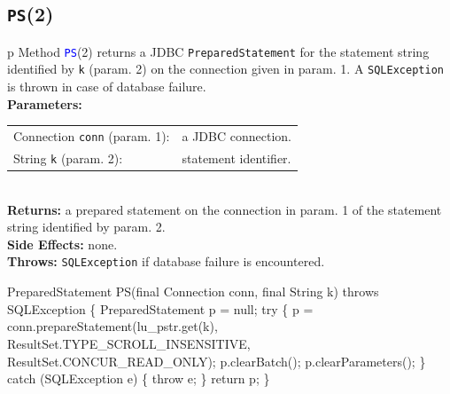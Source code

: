 \subsection{\texttt{PS}(2)}
\begin{tabular}{p{\textwidth}}
\toprule
{}
Method \textcolor{blue}{{\tt{}\protect{}PS}}(2) returns a JDBC {\tt{}PreparedStatement} for the
statement string identified by {\tt{}k} (param. 2) on the connection given in
param. 1.  A {\tt{}SQLException} is thrown in case of database failure.\\
\midrule
\textbf{Parameters:} \\
\begin{tabular}{lp{116mm}}
Connection {\tt{}conn} (param. 1):&a JDBC connection.\\
String {\tt{}k} (param. 2):&statement identifier.\\
\end{tabular}\\
\textbf{Returns:} a prepared statement on the connection in param. 1 of the
statement string identified by param. 2.\\
\textbf{Side Effects:} none.\\
\textbf{Throws:} {\tt{}SQLException} if database failure is encountered.\\
\bottomrule
\end{tabular}
\nwenddocs{}\endmoddef{}
PreparedStatement PS(final Connection conn, final String k) throws SQLException \{
  PreparedStatement p = null;
  try \{
    p = conn.prepareStatement(lu_pstr.get(k),
      ResultSet.TYPE_SCROLL_INSENSITIVE, ResultSet.CONCUR_READ_ONLY);
    p.clearBatch();
    p.clearParameters();
  \} catch (SQLException e) \{
    throw e;
  \}
  return p;
\}
\eatline
{}\nwendcode{}\nwdocspar
